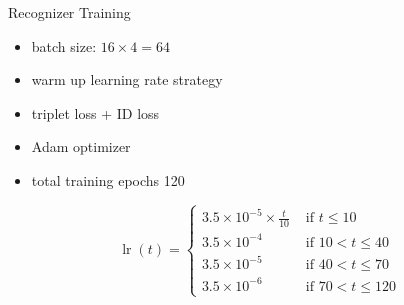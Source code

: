 \begin{frame}{Recognizer Training}
    \begin{itemize}
        \item batch size: $16 \times 4 = 64$
        \item warm up learning rate strategy \cite{learning-rate-warmup-2018}
        \item triplet loss + ID loss
        \item Adam optimizer
        \item total training epochs 120 \cite{tricks-and-baseline-for-reid-2019}
    \end{itemize}

    $$
        \operatorname{lr}(t)=\left\{
        \begin{array}{ll}
        {3.5 \times 10^{-5} \times \frac{t}{10}} & {\text { if } t \leq 10} \\
        {3.5 \times 10^{-4}} & {\text { if } 10<t \leq 40} \\
        {3.5 \times 10^{-5}} & {\text { if } 40<t \leq 70} \\
        {3.5 \times 10^{-6}} & {\text { if } 70<t \leq 120}
        \end{array}\right.
    $$
    
\end{frame}

